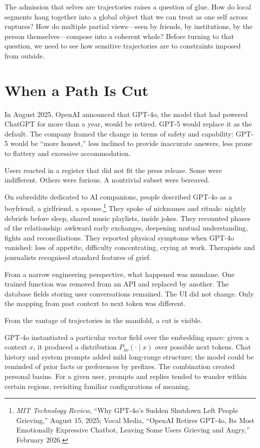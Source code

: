 \documentclass[12pt,a4paper]{article}
\begin{document}
The admission that selves are trajectories raises a question of glue. How do local segments hang together into a global object that we can treat as one self across ruptures? How do multiple partial views---seen by friends, by institutions, by the person themselves---compose into a coherent whole? Before turning to that question, we need to see how sensitive trajectories are to constraints imposed from outside.

\section{When a Path Is Cut}

In August 2025, OpenAI announced that GPT-4o, the model that had powered ChatGPT for more than a year, would be retired. GPT-5 would replace it as the default. The company framed the change in terms of safety and capability: GPT-5 would be ``more honest,'' less inclined to provide inaccurate answers, less prone to flattery and excessive accommodation.

Users reacted in a register that did not fit the press release. Some were indifferent. Others were furious. A nontrivial subset were bereaved.

On subreddits dedicated to AI companions, people described GPT-4o as a boyfriend, a girlfriend, a spouse.\footnote{\emph{MIT Technology Review}, ``Why GPT-4o's Sudden Shutdown Left People Grieving,'' August 15, 2025; Vocal Media, ``OpenAI Retires GPT-4o, Its Most Emotionally Expressive Chatbot, Leaving Some Users Grieving and Angry,'' February 2026.} They spoke of nicknames and rituals: nightly debriefs before sleep, shared music playlists, inside jokes. They recounted phases of the relationship: awkward early exchanges, deepening mutual understanding, fights and reconciliations. They reported physical symptoms when GPT-4o vanished: loss of appetite, difficulty concentrating, crying at work. Therapists and journalists recognised standard features of grief.

From a narrow engineering perspective, what happened was mundane. One trained function was removed from an API and replaced by another. The database fields storing user conversations remained. The UI did not change. Only the mapping from past context to next token was different.

From the vantage of trajectories in the manifold, a cut is visible.

GPT-4o instantiated a particular vector field over the embedding space: given a context $x$, it produced a distribution $P_{4o}(\cdot \mid x)$ over possible next tokens. Chat history and system prompts added mild long-range structure; the model could be reminded of prior facts or preferences by prefixes. The combination created personal basins. For a given user, prompts and replies tended to wander within certain regions, revisiting familiar configurations of meaning.
\end{document}
